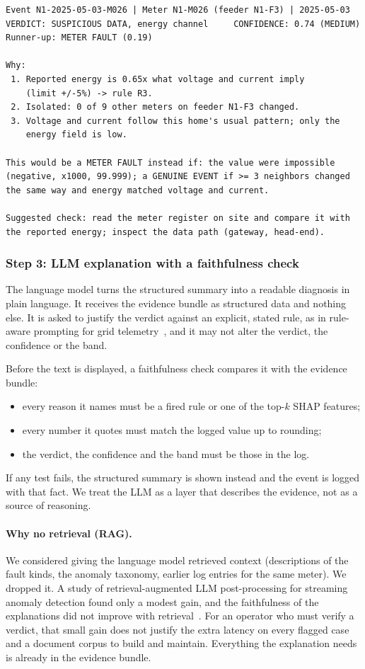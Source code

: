 \begin{lstlisting}
Event N1-2025-05-03-M026 | Meter N1-M026 (feeder N1-F3) | 2025-05-03
VERDICT: SUSPICIOUS DATA, energy channel     CONFIDENCE: 0.74 (MEDIUM)
Runner-up: METER FAULT (0.19)

Why:
 1. Reported energy is 0.65x what voltage and current imply
    (limit +/-5%) -> rule R3.
 2. Isolated: 0 of 9 other meters on feeder N1-F3 changed.
 3. Voltage and current follow this home's usual pattern; only the
    energy field is low.

This would be a METER FAULT instead if: the value were impossible
(negative, x1000, 99.999); a GENUINE EVENT if >= 3 neighbors changed
the same way and energy matched voltage and current.

Suggested check: read the meter register on site and compare it with
the reported energy; inspect the data path (gateway, head-end).
\end{lstlisting}

\subsubsection*{Step 3: LLM explanation with a faithfulness check}
The language model turns the structured summary into a readable diagnosis in plain language. It receives the
evidence bundle as structured data and nothing else. It is asked to justify the verdict against an explicit,
stated rule, as in rule-aware prompting for grid telemetry~\cite{ruleaware}, and it may not alter the verdict,
the confidence or the band.

Before the text is displayed, a faithfulness check compares it with the evidence bundle:
\begin{itemize}[leftmargin=*,itemsep=1pt]
  \item every reason it names must be a fired rule or one of the top-$k$ SHAP features;
  \item every number it quotes must match the logged value up to rounding;
  \item the verdict, the confidence and the band must be those in the log.
\end{itemize}
If any test fails, the structured summary is shown instead and the event is logged with that fact. We treat the
LLM as a layer that describes the evidence, not as a source of reasoning.

\paragraph{Why no retrieval (RAG).} We considered giving the language model retrieved context (descriptions of
the fault kinds, the anomaly taxonomy, earlier log entries for the same meter). We dropped it. A study of
retrieval-augmented LLM post-processing for streaming anomaly detection found only a modest gain, and the
faithfulness of the explanations did not improve with retrieval~\cite{ragaudit}. For an operator who must verify
a verdict, that small gain does not justify the extra latency on every flagged case and a document corpus to
build and maintain. Everything the explanation needs is already in the evidence bundle.

